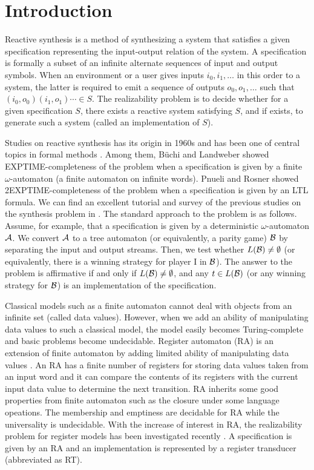 \section{Introduction}
\noindent
Reactive synthesis is a method of synthesizing a system that satisfies a given specification
representing the input-output relation of the system.
A specification is formally a subset of an infinite alternate sequences of input and output symbols.
When an environment or a user gives inputs $i_0, i_1, \ldots$ in this order
to a system, the latter is required to emit a sequence
of outputs $o_0, o_1, \ldots$ such that $(i_0, o_0)(i_1, o_1)\cdots \in S$.
The realizability problem is to decide whether for a given specification $S$,
there exists a reactive system satisfying $S$, and if exists, to generate such a system
(called an implementation of $S$).

Studies on reactive synthesis has its origin in 1960s and has been one of central topics
in formal methods \cite{CGP01}.
Among them, B\"{u}chi and Landweber \cite{BL69} showed EXPTIME-completeness of the problem
when a specification is given by a finite $\omega$-automaton (a finite automaton on infinite words).
Pnueli and Rosner \cite{PR89} showed 2EXPTIME-completeness of the problem
when a specification is given by an LTL formula.
We can find an excellent tutorial and survey of the previous studies
on the synthesis problem in \cite{BCJ18}.
The standard approach to the problem is as follows.
Assume, for example, that a specification is given by a deterministic $\omega$-automaton ${\cal A}$.
We convert ${\cal A}$ to a tree automaton (or equivalently, a parity game) ${\cal B}$
by separating the input and output streams.
Then, we test whether $L({\cal B})\neq\emptyset$ (or equivalently, there is a winning strategy
for player I in ${\cal B}$).
The answer to the problem is affirmative if and only if $L({\cal B})\not=\emptyset$,
and any $t\in L({\cal B})$ (or any winning strategy for ${\cal B}$)
is an implementation of the specification.

Classical models such as a finite automaton cannot deal with
objects from an infinite set (called data values).
However, when we add an ability of manipulating data values to such a classical model,
the model easily becomes Turing-complete and basic problems become undecidable.
Register automaton (RA) is an extension of finite automaton by adding limited ability of
manipulating data values \cite{KF94,NSV04,Se06}.
An RA has a finite number of registers for storing data values taken from an input word and
it can compare the contents of its registers with the current input data value
to determine the next transition.
RA inherits some good properties from finite automaton such as the closure under some
language opeations.
The membership and emptiness are decidable for RA while the universality is undecidable.
With the increase of interest in RA, the realizability problem for register models
has been investigated recently \cite{ESK14,KMB18,EFR19,KK19}.
A specification is given by an RA and
an implementation is represented by a register transducer (abbreviated as RT).

